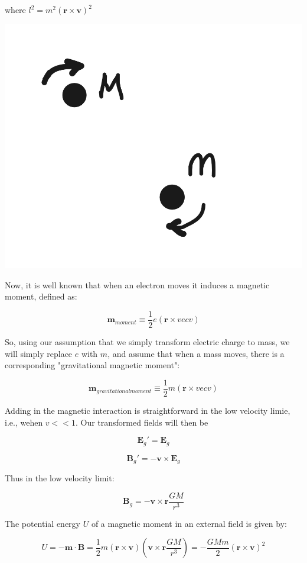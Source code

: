 \documentclass {article}
\renewcommand\vec{\mathbf}
\begin{document}
where $l^2 = m^2 (\vec r \times \vec v)^2$

\begin{center}
	\includegraphics[scale=0.1]{autodraw.png}
\end{center}

Now, it is well known that when an electron moves it induces a magnetic moment, defined as:

$$\vec m_{moment} \equiv \frac 1 {2} e (\vec r \times vec v)$$

So, using our assumption that we simply transform electric charge to mass, we will simply replace $e$ with $m$, and assume that when a mass moves, there is a corresponding "gravitational magnetic moment":

$$\vec m_{gravitational moment} \equiv \frac 1 {2} m (\vec r \times vec v)$$

Adding in the magnetic interaction is straightforward in the low velocity limie, i.e., wehen $v << 1$. Our transformed fields will then be

$$\vec E_g' = \vec E_g$$

$$ \vec B_g' = - \vec v \times \vec E_g$$

Thus in the low velocity limit:

$$\vec B_g = - \vec v \times \vec r \frac {GM} {r^3} $$ 

The potential energy $U$ of a magnetic moment in an external field is given by:

$$U = - \vec m \cdot \vec B = \frac 1 2 m (\vec r \times \vec v)\left(\vec v \times \vec r \frac {GM} {r^3} \right) = - \frac {GMm} 2 (\vec r \times \vec v)^2$$
\end{document}
